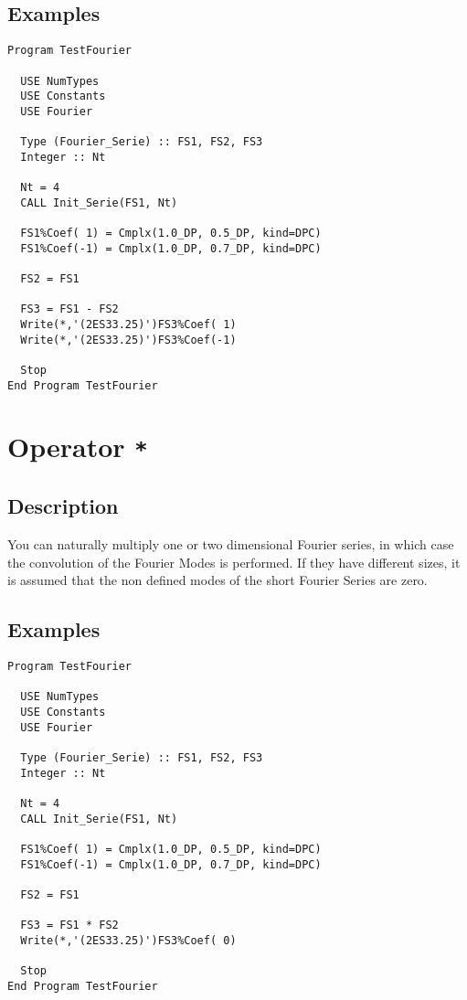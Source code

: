 \subsection{Examples}

\begin{verbatim}
Program TestFourier

  USE NumTypes
  USE Constants
  USE Fourier

  Type (Fourier_Serie) :: FS1, FS2, FS3
  Integer :: Nt

  Nt = 4
  CALL Init_Serie(FS1, Nt)

  FS1%Coef( 1) = Cmplx(1.0_DP, 0.5_DP, kind=DPC)
  FS1%Coef(-1) = Cmplx(1.0_DP, 0.7_DP, kind=DPC)
  
  FS2 = FS1  

  FS3 = FS1 - FS2
  Write(*,'(2ES33.25)')FS3%Coef( 1)
  Write(*,'(2ES33.25)')FS3%Coef(-1)

  Stop
End Program TestFourier
\end{verbatim}

\section{Operator \texttt{*}}

\subsection{Description}

You can naturally multiply one or two dimensional Fourier series, in
which case the convolution of the Fourier Modes is performed. If they
have different sizes, it is assumed that the non defined modes of the
short Fourier Series are zero.

\subsection{Examples}

\begin{verbatim}
Program TestFourier

  USE NumTypes
  USE Constants
  USE Fourier

  Type (Fourier_Serie) :: FS1, FS2, FS3
  Integer :: Nt

  Nt = 4
  CALL Init_Serie(FS1, Nt)

  FS1%Coef( 1) = Cmplx(1.0_DP, 0.5_DP, kind=DPC)
  FS1%Coef(-1) = Cmplx(1.0_DP, 0.7_DP, kind=DPC)
  
  FS2 = FS1  

  FS3 = FS1 * FS2
  Write(*,'(2ES33.25)')FS3%Coef( 0)

  Stop
End Program TestFourier
\end{verbatim}

